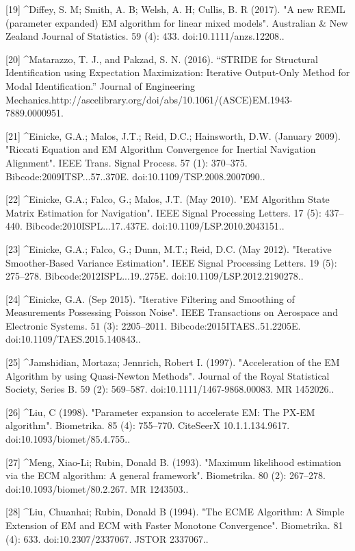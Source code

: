 [19]
^Diffey, S. M; Smith, A. B; Welsh, A. H; Cullis, B. R (2017). "A new REML (parameter expanded) EM algorithm for linear mixed models". Australian & New Zealand Journal of Statistics. 59 (4): 433. doi:10.1111/anzs.12208..

[20]
^Matarazzo, T. J., and Pakzad, S. N. (2016). “STRIDE for Structural Identification using Expectation Maximization: Iterative Output-Only Method for Modal Identification.” Journal of Engineering Mechanics.http://ascelibrary.org/doi/abs/10.1061/(ASCE)EM.1943-7889.0000951.

[21]
^Einicke, G.A.; Malos, J.T.; Reid, D.C.; Hainsworth, D.W. (January 2009). "Riccati Equation and EM Algorithm Convergence for Inertial Navigation Alignment". IEEE Trans. Signal Process. 57 (1): 370–375. Bibcode:2009ITSP...57..370E. doi:10.1109/TSP.2008.2007090..

[22]
^Einicke, G.A.; Falco, G.; Malos, J.T. (May 2010). "EM Algorithm State Matrix Estimation for Navigation". IEEE Signal Processing Letters. 17 (5): 437–440. Bibcode:2010ISPL...17..437E. doi:10.1109/LSP.2010.2043151..

[23]
^Einicke, G.A.; Falco, G.; Dunn, M.T.; Reid, D.C. (May 2012). "Iterative Smoother-Based Variance Estimation". IEEE Signal Processing Letters. 19 (5): 275–278. Bibcode:2012ISPL...19..275E. doi:10.1109/LSP.2012.2190278..

[24]
^Einicke, G.A. (Sep 2015). "Iterative Filtering and Smoothing of Measurements Possessing Poisson Noise". IEEE Transactions on Aerospace and Electronic Systems. 51 (3): 2205–2011. Bibcode:2015ITAES..51.2205E. doi:10.1109/TAES.2015.140843..

[25]
^Jamshidian, Mortaza; Jennrich, Robert I. (1997). "Acceleration of the EM Algorithm by using Quasi-Newton Methods". Journal of the Royal Statistical Society, Series B. 59 (2): 569–587. doi:10.1111/1467-9868.00083. MR 1452026..

[26]
^Liu, C (1998). "Parameter expansion to accelerate EM: The PX-EM algorithm". Biometrika. 85 (4): 755–770. CiteSeerX 10.1.1.134.9617. doi:10.1093/biomet/85.4.755..

[27]
^Meng, Xiao-Li; Rubin, Donald B. (1993). "Maximum likelihood estimation via the ECM algorithm: A general framework". Biometrika. 80 (2): 267–278. doi:10.1093/biomet/80.2.267. MR 1243503..

[28]
^Liu, Chuanhai; Rubin, Donald B (1994). "The ECME Algorithm: A Simple Extension of EM and ECM with Faster Monotone Convergence". Biometrika. 81 (4): 633. doi:10.2307/2337067. JSTOR 2337067..

